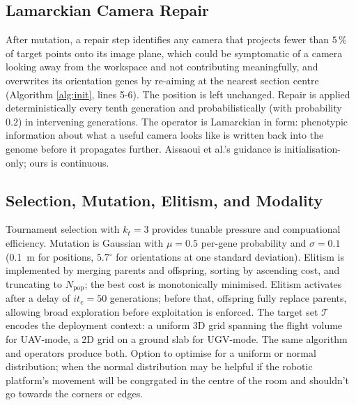 \documentclass[conference]{IEEEtran}
\begin{document}
\subsection{Lamarckian Camera Repair}
After mutation, a repair step identifies any camera that projects fewer than $5\,\%$ of target points onto its image plane, which could be symptomatic of a camera looking away from the workspace and not contributing meaningfully, and overwrites its orientation genes by re-aiming at the nearest section centre
(Algorithm \ref{alg:init}, lines 5-6). The position is left unchanged. Repair is applied deterministically every tenth generation and probabilistically (with probability $0.2$) in intervening generations. The operator is Lamarckian in form: phenotypic information about what a useful camera looks like is written back into the genome before it propagates further. Aissaoui et al.'s guidance is initialisation-only; ours is continuous.

\subsection{Selection, Mutation, Elitism, and Modality}
Tournament selection with $k_t=3$ provides tunable pressure and compuational efficiency. Mutation is Gaussian with $\mu=0.5$ per-gene probability and $\sigma=0.1$ (\SI{0.1}{\metre} for positions, ${5.7}{^\circ}$ for orientations at one standard deviation). Elitism is implemented by merging parents and offspring, sorting by ascending cost, and truncating to $N_\text{pop}$; the best cost is monotonically minimised. Elitism activates after a delay of $it_e=50$ generations; before that, offspring fully replace parents, allowing broad exploration before exploitation is enforced. The target set $\mathcal{T}$ encodes the deployment context: a uniform 3D grid spanning the flight volume for UAV-mode, a 2D grid on a ground slab for UGV-mode. The same algorithm and operators produce both. Option to optimise for a uniform or normal distribution; when the normal distribution may be helpful if the robotic platform's movement will be congrgated in the centre of the room and shouldn't go towards the corners or edges.
\end{document}
